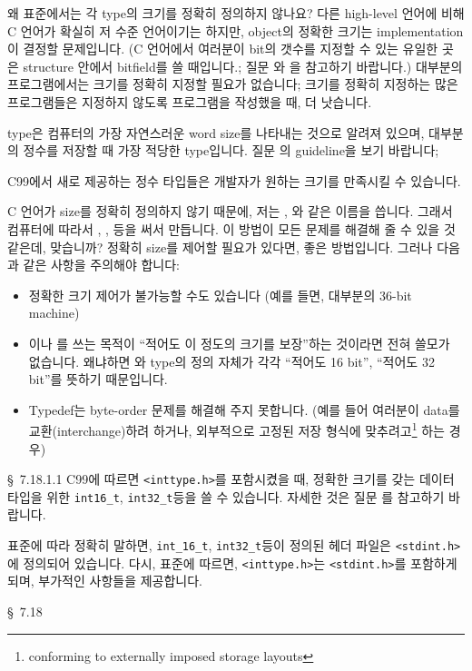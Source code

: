 \begin{faq}
	왜 표준에서는 각 type의 크기를 정확히 정의하지 않나요?
\A
	다른 high-level 언어에 비해 C 언어가 확실히 저 수준 언어이기는
	하지만, object의 정확한 크기는 implementation이 결정할 문제입니다.
	(C 언어에서 여러분이 bit의 갯수를 지정할 수 있는 유일한 곳은
	structure 안에서 bitfield를 쓸 때입니다.; 질문 와 을
	참고하기 바랍니다.)  대부분의 프로그램에서는 크기를 정확히
	지정할 필요가 없습니다;  크기를 정확히 지정하는 많은 프로그램들은
	지정하지 않도록 프로그램을 작성했을 때, 더 낫습니다.

	 type은 컴퓨터의 가장 자연스러운 word size를 나타내는 것으로
	알려져 있으며, 대부분의 정수를 저장할 때 가장 적당한 type입니다.
	질문 의 guideline을 보기 바랍니다; 

\T
	C99에서 새로 제공하는 정수 타입들은 개발자가 원하는 크기를 만족시킬
        수 있습니다. 
        
\end{faq}


\begin{faq}
	C 언어가 size를 정확히 정의하지 않기 때문에, 저는 ,
	와 같은  이름을 씁니다.  그래서
	컴퓨터에 따라서 , ,  등을 써서
	만듭니다.  이 방법이 모든 문제를 해결해 줄 수 있을 것 같은데,
	맞습니까?
\A
	정확히 size를 제어할 필요가 있다면, 좋은 방법입니다.
	그러나 다음과 같은 사항을 주의해야 합니다:
\begin{itemize}
\item
	정확한 크기 제어가 불가능할 수도 있습니다 (예를 들면,
	대부분의 36-bit machine)
\item
	이나 를 쓰는 목적이 ``적어도 이 정도의 크기를
	보장''하는 것이라면 전혀 쓸모가 없습니다.  왜냐하면 와
	 type의 정의 자체가 각각 ``적어도 16 bit'', ``적어도
	32 bit''를 뜻하기 때문입니다.
\item
	Typedef는 byte-order 문제를 해결해 주지 못합니다.
	(예를 들어 여러분이 data를 교환(interchange)하려 하거나,
	외부적으로 고정된 저장 형식에 맞추려고\footnote{conforming
	to externally imposed storage layouts} 하는 경우)
\end{itemize}

\R
        \cite{c89} \S\ 7.18.1.1
\T
        C99에 따르면 \verb+<inttype.h>+를 포함시켰을 때, 정확한 크기를 갖는
        데이터 타입을 위한 \verb+int16_t+, \verb+int32_t+등을 쓸 수
        있습니다. 자세한 것은 질문 를 참고하기 바랍니다.

        표준에 따라 정확히 말하면, \verb+int_16_t+, \verb+int32_t+등이
        정의된 헤더 파일은 \verb+<stdint.h>+에 정의되어 있습니다.
        다시, 표준에 따르면, \verb+<inttype.h>+는 \verb+<stdint.h>+를
        포함하게 되며, 부가적인 사항들을 제공합니다.


\R
	\cite{c99} \S\ 7.18
\end{faq}

